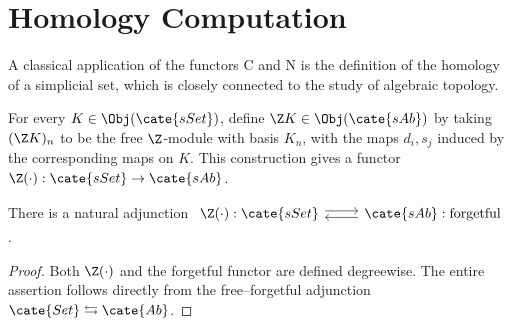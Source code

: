 
\section{Homology Computation}\label{sec:homology-computation}
\hypertarget{o014.aljabr2.chapter8.homology-computation}{ }
A classical application of the functors $\mathrm{C}$ and $\mathrm{N}$ is the
definition of the homology of a simplicial set, which is closely connected to
the study of algebraic topology.

\begin{definition}\label{def:free-simplicial-Ab}
	For every $K\in\Obj(\cate{sSet})$, define
	$\Z K\in\Obj(\cate{sAb})$ by taking $(\Z K)_n$ to be the free
	$\Z$-module with basis $K_n$, with the maps $d_i,s_j$ induced by the
	corresponding maps on $K$. This construction gives a functor
	$\Z(\cdot):\cate{sSet}\to\cate{sAb}$.
\end{definition}

\begin{proposition}\label{prop:free-simplicial-Ab-adjunction}
	There is a natural adjunction
	$\begin{tikzcd}
		\Z(\cdot):\cate{sSet}\arrow[shift left,r]
		&\cate{sAb}:\text{forgetful}\arrow[shift left,l]
	\end{tikzcd}$.
\end{proposition}
\begin{proof}
	Both $\Z(\cdot)$ and the forgetful functor are defined degreewise. The
	entire assertion follows directly from the free--forgetful adjunction
	$\cate{Set}\leftrightarrows\cate{Ab}$.
\end{proof}

